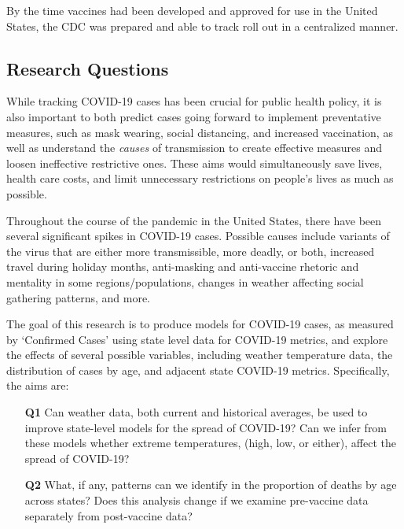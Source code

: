 \documentclass[11pt]{article}
\begin{document}
	By the time vaccines had been developed and approved for use in the United States, the CDC was prepared and able to track roll out in a centralized manner. 
	

\subsection{Research Questions}

While tracking COVID-19 cases has been crucial for public health policy, it is also important to both predict cases going forward to implement preventative measures, such as mask wearing, social distancing, and increased vaccination, as well as understand the \textit{causes} of transmission to create effective measures and loosen ineffective restrictive ones. These aims would simultaneously save lives, health care costs, and limit unnecessary restrictions on people's lives as much as possible. 

Throughout the course of the pandemic in the United States, there have been several significant spikes in COVID-19 cases. Possible causes include variants of the virus that are either more transmissible, more deadly, or both, increased travel during holiday months, anti-masking and anti-vaccine rhetoric and mentality in some regions/populations, changes in weather affecting social gathering patterns, and more. 

The goal of this research is to produce models for COVID-19 cases, as measured by `Confirmed Cases' using state level data for COVID-19 metrics, and explore the effects of several possible variables, including weather temperature data,  the distribution of cases by age, and adjacent state COVID-19 metrics.  Specifically, the aims are: 
\begin{enumerate}
\item[\bf Q1] Can weather data, both current and historical averages, be used to improve state-level models for the spread of COVID-19? Can we infer from these models whether extreme temperatures, (high, low, or either), affect the spread of COVID-19? 
\item[\bf Q2] What, if any, patterns can we identify in the proportion of deaths by age across states? Does this analysis change if we examine pre-vaccine data separately from post-vaccine data? 
\end{enumerate}
\end{document}
